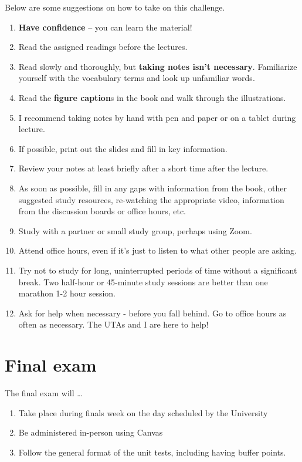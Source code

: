 \documentclass[
]{book}
\providecommand{\tightlist}{%
  \setlength{\itemsep}{0pt}\setlength{\parskip}{0pt}}
\begin{document}
Below are some suggestions on how to take on this challenge.

\begin{enumerate}
\def\labelenumi{\arabic{enumi}.}
\tightlist
\item
  \textbf{Have confidence} -- you can learn the material!\\
\item
  Read the assigned readings before the lectures.
\item
  Read slowly and thoroughly, but \textbf{taking notes isn't necessary}. Familiarize yourself with the vocabulary terms and look up unfamiliar words.
\item
  Read the \textbf{figure caption}s in the book and walk through the illustrations.
\item
  I recommend taking notes by hand with pen and paper or on a tablet during lecture.
\item
  If possible, print out the slides and fill in key information.
\item
  Review your notes at least briefly after a short time after the lecture.
\item
  As soon as possible, fill in any gaps with information from the book, other suggested study resources, re-watching the appropriate video, information from the discussion boards or office hours, etc.
\item
  Study with a partner or small study group, perhaps using Zoom.
\item
  Attend office hours, even if it's just to listen to what other people are asking.
\item
  Try not to study for long, uninterrupted periods of time without a significant break.
  Two half-hour or 45-minute study sessions are better than one marathon 1-2 hour session.
\item
  Ask for help when necessary - before you fall behind. Go to office hours as often as necessary. The UTAs and I are here to help!
\end{enumerate}

\hypertarget{final-exam}{%
\chapter{Final exam}\label{final-exam}}

The final exam will \ldots{}

\begin{enumerate}
\def\labelenumi{\arabic{enumi}.}
\tightlist
\item
  Take place during finals week on the day scheduled by the University
\item
  Be administered in-person using Canvas
\item
  Follow the general format of the unit tests, including having buffer points.
\end{enumerate}
\end{document}
